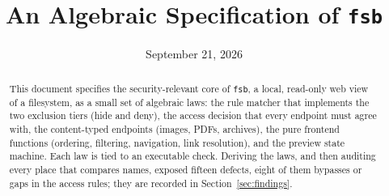 \documentclass[11pt]{article}
\title{An Algebraic Specification of \texttt{fsb}}
\author{}
\date{September 21, 2026}
\begin{document}
\maketitle
\begin{abstract}
This document specifies the security-relevant core of \texttt{fsb}, a local,
read-only web view of a filesystem, as a small set of algebraic laws: the rule
matcher that implements the two exclusion tiers (hide and deny), the access
decision that every endpoint must agree with, the content-typed endpoints
(images, PDFs, archives), the pure frontend functions (ordering, filtering,
navigation, link resolution), and the preview state machine.  Each law is tied
to an executable check.  Deriving the laws, and then auditing every place that compares names,
exposed fifteen defects, eight of them bypasses or gaps in the access rules; they are recorded in Section~\ref{sec:findings}.
\end{abstract}

\tableofcontents











\end{document}
